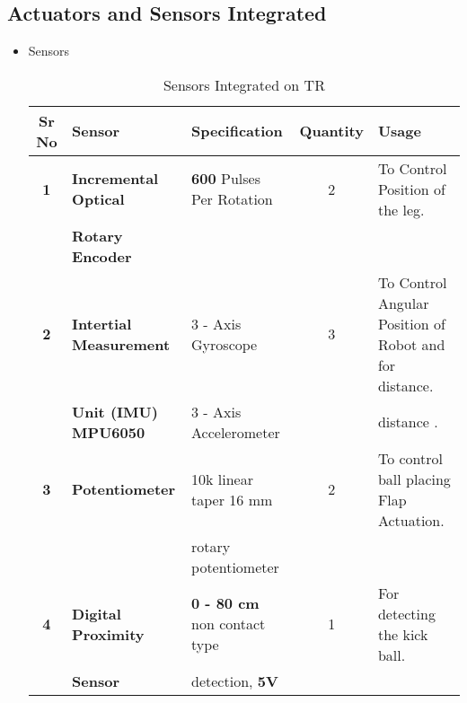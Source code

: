     \subsection{Actuators and Sensors Integrated}
        \begin{itemize}
            \item Sensors
            \begin{table}[h]
                \caption {Sensors Integrated on TR} \label{Sensors_TR}  \small
                \begin{tabular}{|c|l|l|c|l|}
                    \hline  \hline
                    \textbf{Sr No}  & \textbf{Sensor}                   & \textbf{Specification}                & \textbf{Quantity} & \textbf{Usage}                                            \\ \hline   \hline                    
                    \textbf{1}      & \textbf{Incremental Optical}      & \textbf{600} Pulses Per Rotation      &        2          & To Control Position of the leg.                           \\
                                    & \textbf{Rotary Encoder}           &                                       &                   &                                                           \\ \hline         
                    \textbf{2}      & \textbf{Intertial Measurement}    & 3 - Axis Gyroscope                    &        3          & To Control Angular Position of  Robot and for distance.   \\ 
                                    & \textbf{Unit (IMU) MPU6050}       & 3 - Axis Accelerometer                &                   & distance .                                                \\ \hline 
                    \textbf{3}      & \textbf{Potentiometer}            & 10k linear taper 16 mm                &        2          & To control ball placing Flap Actuation.                   \\
                                    &                                   & rotary potentiometer                  &                   &                                                           \\ \hline
                    \textbf{4}      & \textbf{Digital Proximity}        & \textbf{0 - 80 cm} non contact type   &        1          & For detecting the kick ball.                              \\
                                    & \textbf{Sensor}                   & detection, \textbf{ 5V}               &                   &                                                           \\ \hline                                    

\end{tabular}
\end{table}
\end{itemize}

